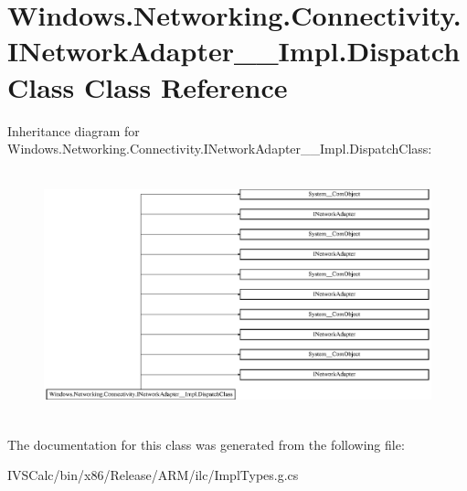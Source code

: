 \hypertarget{class_windows_1_1_networking_1_1_connectivity_1_1_i_network_adapter_____impl_1_1_dispatch_class}{}\section{Windows.\+Networking.\+Connectivity.\+I\+Network\+Adapter\+\_\+\+\_\+\+Impl.\+Dispatch\+Class Class Reference}
\label{class_windows_1_1_networking_1_1_connectivity_1_1_i_network_adapter_____impl_1_1_dispatch_class}
Inheritance diagram for Windows.\+Networking.\+Connectivity.\+I\+Network\+Adapter\+\_\+\+\_\+\+Impl.\+Dispatch\+Class\+:\begin{figure}[H]
\begin{center}
\leavevmode
\includegraphics[height=7.179487cm]{class_windows_1_1_networking_1_1_connectivity_1_1_i_network_adapter_____impl_1_1_dispatch_class}
\end{center}
\end{figure}


The documentation for this class was generated from the following file\+:\begin{DoxyCompactItemize}
\item 
I\+V\+S\+Calc/bin/x86/\+Release/\+A\+R\+M/ilc/Impl\+Types.\+g.\+cs\end{DoxyCompactItemize}
